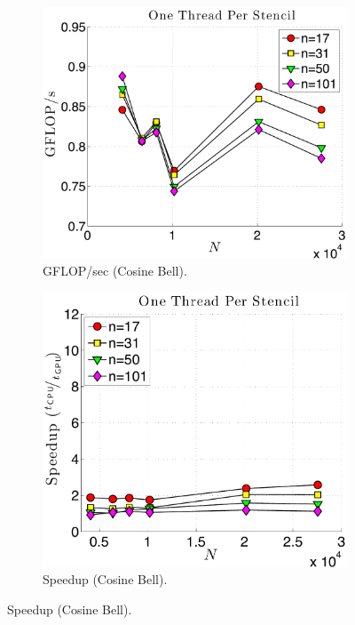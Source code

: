 \begin{figure}
\centering
\begin{subfigure}[t]{0.46\textwidth}
\includegraphics[width=\textwidth]{../figures/keeneland_results/alltoallv_cosine/gflops_gpu_1proc_oneThreadPerStencil.pdf}
\caption{GFLOP/sec (Cosine Bell).}
\label{fig:gflops_gpu_1proc_oneThread_keeneland_cosine}
\end{subfigure}
\quad
\begin{subfigure}[t]{0.425\textwidth}
\includegraphics[width=\textwidth]{../figures/keeneland_results/alltoallv_cosine/speedup_1proc_oneThreadPerStencil.pdf}
\caption{Speedup (Cosine Bell).}
\label{fig:speedup_1proc_oneThread_keeneland_cosine}
\end{subfigure} 


\end{figure}
